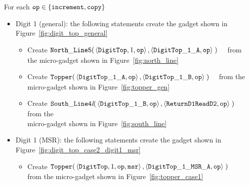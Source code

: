 For each ${\tt op} \in \{ {\tt increment, copy } \}$
    \begin{itemize}


        \item Digit 1 (general): the following statements create the gadget shown in Figure~\ref{fig:digit_top_general}
        \begin{itemize}
            \item Create
            $\begin{aligned}[t]
                {\tt North\_Line5}(& \left \langle {\tt DigitTop}, 1,    {\tt op} \right\rangle,
                                     \left \langle {\tt DigitTop\_1\_A}, {\tt op} \right\rangle \;)
            \end{aligned}$ from the micro-gadget shown in Figure~\ref{fig:north_line}

            \item Create
            $\begin{aligned}[t]
                {\tt Topper}(& \left \langle {\tt DigitTop\_1\_A}, {\tt op} \right\rangle,
                               \left \langle {\tt DigitTop\_1\_B}, {\tt op} \right\rangle \;)
            \end{aligned}$ from the micro-gadget shown in Figure~\ref{fig:topper_gen}

            \item Create
            $\begin{aligned}[t]
                {\tt South\_Line4\textit{l}}(& \left \langle {\tt DigitTop\_1\_B}, {\tt op} \right\rangle,
                                               \left \langle {\tt ReturnD1ReadD2}, {\tt op} \right\rangle \;)
            \end{aligned}$ from the\\micro-gadget shown in Figure~\ref{fig:south_line}
        \end{itemize}
        \vspace{1cm}

        \item Digit 1 (MSR): the following statements create the gadget shown in Figure~\ref{fig:digit_top_case2_digit1_msr}
        \begin{itemize}
            \item Create
            $\begin{aligned}[t]
                {\tt Topper}(& \left\langle {\tt DigitTop}, 1,          {\tt op}, {\tt msr} \right\rangle,
                               \left\langle {\tt DigitTop\_1\_MSR\_A},  {\tt op}            \right\rangle \;)
            \end{aligned}$ \\ from the micro-gadget shown in Figure~\ref{fig:topper_case1}



\end{itemize}
\end{itemize}
